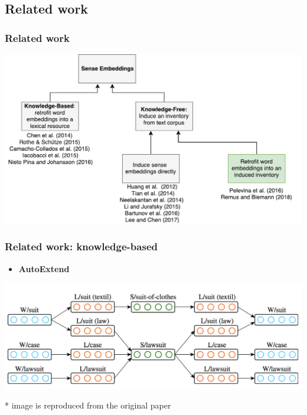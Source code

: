 \documentclass{beamer}
\begin{document}
\subsection{Related work}
\begin{frame}[fragile]
\frametitle{Related work}
\begin{center}
 \includegraphics[height=0.56\textwidth]{sense_embeddings}
 \end{center}
\end{frame}


\begin{frame}
\frametitle{Related work: knowledge-based}
\begin{itemize}
	\item \textbf{AutoExtend}~\cite{rothe-schutze:2015:ACL-IJCNLP}
\end{itemize}
\begin{center}
 \includegraphics[width=1.0\textwidth]{autoextend}
 \end{center}

{\footnotesize
 * image is reproduced from the original paper
}

\end{frame}
\end{document}
